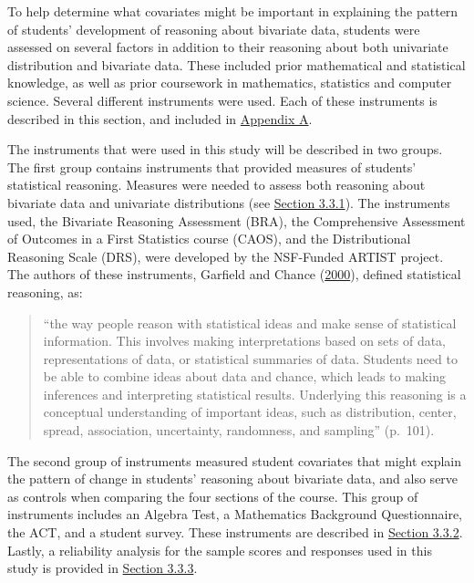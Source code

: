 \documentclass[11pt]{umnthesis}
\begin{document}
To help determine what covariates might be important in explaining the pattern of students' development of reasoning about bivariate data, students were assessed on several factors in addition to their reasoning about both univariate distribution and bivariate data. These included prior mathematical and statistical knowledge, as well as prior coursework in mathematics, statistics and computer science. Several different instruments were used. Each of these instruments is described in this section, and included in \protect\hyperlink{appendix-a}{Appendix A}.

The instruments that were used in this study will be described in two groups. The first group contains instruments that provided measures of students' statistical reasoning. Measures were needed to assess both reasoning about bivariate data and univariate distributions (see \protect\hyperlink{assess-statreason}{Section 3.3.1}). The instruments used, the Bivariate Reasoning Assessment (BRA), the Comprehensive Assessment of Outcomes in a First Statistics course (CAOS), and the Distributional Reasoning Scale (DRS), were developed by the NSF-Funded ARTIST project. The authors of these instruments, Garfield and Chance (\protect\hyperlink{ref-garfield:2000}{2000}), defined statistical reasoning, as:

\begin{quote}
``the way people reason with statistical ideas and make sense of statistical information. This involves making interpretations based on sets of data, representations of data, or statistical summaries of data. Students need to be able to combine ideas about data and chance, which leads to making inferences and interpreting statistical results. Underlying this reasoning is a conceptual understanding of important ideas, such as distribution, center, spread, association, uncertainty, randomness, and sampling'' (p.~101).
\end{quote}

The second group of instruments measured student covariates that might explain the pattern of change in students' reasoning about bivariate data, and also serve as controls when comparing the four sections of the course. This group of instruments includes an Algebra Test, a Mathematics Background Questionnaire, the ACT, and a student survey. These instruments are described in \protect\hyperlink{assess-covar}{Section 3.3.2}. Lastly, a reliability analysis for the sample scores and responses used in this study is provided in \protect\hyperlink{reliability}{Section 3.3.3}.
\end{document}
